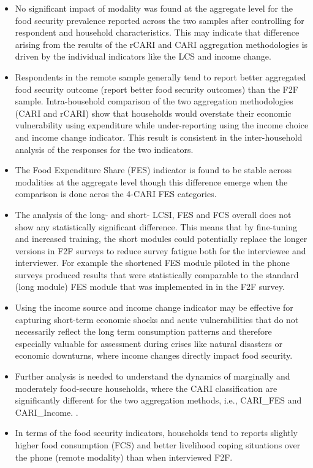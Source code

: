 \documentclass[11pt,harvard]{article}
\begin{document}
	\begin{itemize}[left=2.5em]
		\item No significant impact of modality was found at the aggregate level for the food security prevalence reported across the two samples after controlling for respondent and household characteristics. This may indicate that difference arising from the results of the rCARI and CARI aggregation methodologies is driven by the individual indicators like the LCS and income change.
		
		\item Respondents in the remote sample generally tend to report better aggregated food security outcome (report better food security outcomes) than the F2F sample. Intra-household comparison of the two aggregation methodologies (CARI and rCARI) show that households would overstate their economic vulnerability using expenditure while under-reporting using the income choice and income change indicator. This result is consistent in the inter-household analysis of the responses for the two indicators.
		
		\item The Food Expenditure Share (FES) indicator is found to be stable across modalities at the aggregate level though this difference emerge when the comparison is done acros the 4-CARI FES categories.
		
		\item The analysis of the long- and short- LCSI, FES and FCS overall does not show any statistically significant difference. This means that by fine-tuning and increased training, the short modules could potentially replace the longer versions in F2F surveys to reduce survey fatigue both for the interviewee and interviewer. For example the shortened FES module piloted in the phone surveys produced results that were statistically comparable to the standard (long module) FES module that was implemented in in the F2F survey. 
		 
		\item Using the income source and income change indicator may be effective for capturing short-term economic shocks and acute vulnerabilities that do not necessarily reflect the long term consumption patterns and therefore especially valuable for assessment during crises like natural disasters or economic downturns, where income changes directly impact food security.
		\item Further analysis is needed to understand the dynamics of marginally and moderately food-secure households, where the CARI classification are significantly different for the two aggregation methods, i.e., CARI\_FES and CARI\_Income.
.
		\item In terms of the food security indicators, households tend to reports slightly higher food consumption (FCS) and better livelihood coping situations over the phone (remote modality) than when interviewed F2F. 
	\end{itemize}
	
\end{document}

